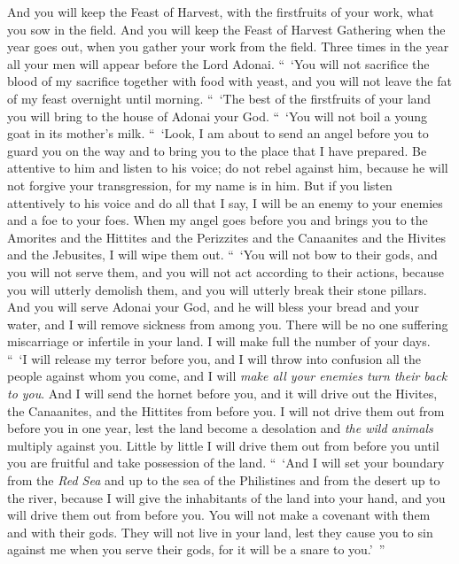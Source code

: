 \begin{biblechapter}
\verse And you will keep the Feast of Harvest, with the firstfruits of your work, what you sow in the field. And you will keep the Feast of Harvest Gathering when the year goes out, when you gather your work from the field.
\verse Three times in the year all your men will appear before the Lord Adonai.
\verse “ ‘You will not sacrifice the blood of my sacrifice together with food with yeast, and you will not leave the fat of my feast overnight until morning.
\verse “ ‘The best of the firstfruits of your land you will bring to the house of Adonai your God. “ ‘You will not boil a young goat in its mother’s milk.
 “ ‘Look, I am about to send an angel before you to guard you on the way and to bring you to the place that I have prepared.
\verse Be attentive to him and listen to his voice; do not rebel against him, because he will not forgive your transgression, for my name is in him.
\verse But if you listen attentively to his voice and do all that I say, I will be an enemy to your enemies and a foe to your foes.
\verse When my angel goes before you and brings you to the Amorites and the Hittites and the Perizzites and the Canaanites and the Hivites and the Jebusites, I will wipe them out.
\verse “ ‘You will not bow to their gods, and you will not serve them, and you will not act according to their actions, because you will utterly demolish them, and you will utterly break their stone pillars.
\verse And you will serve Adonai your God, and he will bless your bread and your water, and I will remove sickness from among you.
\verse There will be no one suffering miscarriage or infertile in your land. I will make full the number of your days.
\verse “ ‘I will release my terror before you, and I will throw into confusion all the people against whom you come, and I will \textit{make all your enemies turn their back to you}.
\verse And I will send the hornet before you, and it will drive out the Hivites, the Canaanites, and the Hittites from before you.
\verse I will not drive them out from before you in one year, lest the land become a desolation and \textit{the wild animals} multiply against you.
\verse Little by little I will drive them out from before you until you are fruitful and take possession of the land.
\verse “ ‘And I will set your boundary from the \textit{Red Sea} and up to the sea of the Philistines and from the desert up to the river, because I will give the inhabitants of the land into your hand, and you will drive them out from before you.
\verse You will not make a covenant with them and with their gods.
\verse They will not live in your land, lest they cause you to sin against me when you serve their gods, for it will be a snare to you.’ ”
\end{biblechapter}

